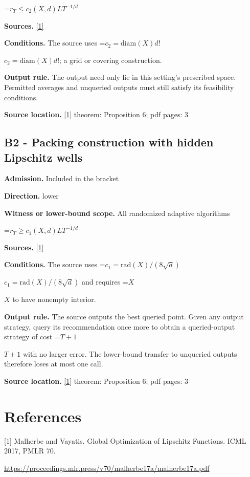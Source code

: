 \documentclass[10pt,a4paper]{article}
\newcommand{\AtlasMath}[1]{\par\begingroup\centering\setbox0=\hbox{$\displaystyle #1$}\ifdim\wd0>1.4\linewidth\typeout{ATLAS WIDE FORMULA: \the\wd0}\fi\ifdim\wd0>\linewidth\resizebox{\linewidth}{!}{\box0}\else\box0\fi\par\endgroup}
\newcommand{\AtlasInlineMath}[1]{\begingroup\setbox0=\hbox{$#1$}\ifdim\wd0>.4\linewidth\endgroup\AtlasMath{#1}\else\endgroup$#1$\fi}
\begin{document}
\AtlasMath{r_T\le c_2(X,d)L T^{-1/d}}
\textbf{Sources.} \href{https://proceedings.mlr.press/v70/malherbe17a/malherbe17a.pdf}{[1]}

\textbf{Conditions.} The source uses \AtlasInlineMath{c_2=\mathrm{diam}(X)d!}; a grid or covering construction.

\textbf{Output rule.} The output need only lie in this setting's prescribed space. Permitted averages and unqueried outputs must still satisfy its feasibility conditions.

\textbf{Source location.} \href{https://proceedings.mlr.press/v70/malherbe17a/malherbe17a.pdf}{[1]} theorem: Proposition 6; pdf pages: 3

\subsection{B2 - Packing construction with hidden Lipschitz wells}
\textbf{Admission.} Included in the bracket

\textbf{Direction.} lower

\textbf{Witness or lower-bound scope.} All randomized adaptive algorithms

\AtlasMath{r_T\ge c_1(X,d)L T^{-1/d}}
\textbf{Sources.} \href{https://proceedings.mlr.press/v70/malherbe17a/malherbe17a.pdf}{[1]}

\textbf{Conditions.} The source uses \AtlasInlineMath{c_1=\mathrm{rad}(X)/(8\sqrt d)} and requires \AtlasInlineMath{X} to have nonempty interior.

\textbf{Output rule.} The source outputs the best queried point. Given any output strategy, query its recommendation once more to obtain a queried-output strategy of cost \AtlasInlineMath{T+1} with no larger error. The lower-bound transfer to unqueried outputs therefore loses at most one call.

\textbf{Source location.} \href{https://proceedings.mlr.press/v70/malherbe17a/malherbe17a.pdf}{[1]} theorem: Proposition 6; pdf pages: 3

\section{References}
[1] Malherbe and Vayatis. Global Optimization of Lipschitz Functions. ICML 2017, PMLR 70.

\url{https://proceedings.mlr.press/v70/malherbe17a/malherbe17a.pdf}
\end{document}
